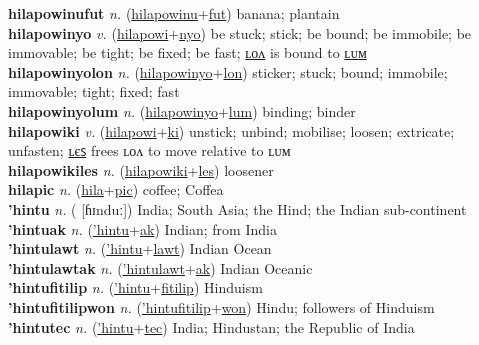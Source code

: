 \textbf{hilapowinufut} \textit{n.} (\hyperref[hilapowinu]{hilapowinu}+\hyperref[fut]{fut})
banana; plantain \label{hilapowinufut} \\
\textbf{hilapowinyo} \textit{v.} (\hyperref[hilapowi]{hilapowi}+\hyperref[nyo]{nyo})
be stuck; stick; be bound; be immobile; be immovable; be tight; be fixed; be fast; \hyperref[hilapowinyolon]{ʟᴏᴧ} is bound to \hyperref[hilapowinyolum]{ʟᴜᴍ} \label{hilapowinyo} \\
\textbf{hilapowinyolon} \textit{n.} (\hyperref[hilapowinyo]{hilapowinyo}+\hyperref[lon]{lon})
sticker; stuck; bound; immobile; immovable; tight; fixed; fast \label{hilapowinyolon} \\
\textbf{hilapowinyolum} \textit{n.} (\hyperref[hilapowinyo]{hilapowinyo}+\hyperref[lum]{lum})
binding; binder \label{hilapowinyolum} \\
\textbf{hilapowiki} \textit{v.} (\hyperref[hilapowi]{hilapowi}+\hyperref[ki]{ki})
unstick; unbind; mobilise; loosen; extricate; unfasten; \hyperref[hilapowikiles]{ʟєꜱ} frees ʟᴏᴧ to move relative to ʟᴜᴍ \label{hilapowiki} \\
\textbf{hilapowikiles} \textit{n.} (\hyperref[hilapowiki]{hilapowiki}+\hyperref[les]{les})
loosener \label{hilapowikiles} \\
\textbf{hilapic} \textit{n.} (\hyperref[hila]{hila}+\hyperref[pic]{pic})
coffee; Coffea \label{hilapic} \\
\textbf{'hintu} \textit{n.} ( [ɦɪnduː])
India; South Asia; the Hind; the Indian sub-continent \label{'hintu} \\
\textbf{'hintuak} \textit{n.} (\hyperref['hintu]{'hintu}+\hyperref[ak]{ak})
Indian; from India \label{'hintuak} \\
\textbf{'hintulawt} \textit{n.} (\hyperref['hintu]{'hintu}+\hyperref[lawt]{lawt})
Indian Ocean \label{'hintulawt} \\
\textbf{'hintulawtak} \textit{n.} (\hyperref['hintulawt]{'hintulawt}+\hyperref[ak]{ak})
Indian Oceanic \label{'hintulawtak} \\
\textbf{'hintufitilip} \textit{n.} (\hyperref['hintu]{'hintu}+\hyperref[fitilip]{fitilip})
Hinduism \label{'hintufitilip} \\
\textbf{'hintufitilipwon} \textit{n.} (\hyperref['hintufitilip]{'hintufitilip}+\hyperref[won]{won})
Hindu; followers of Hinduism \label{'hintufitilipwon} \\
\textbf{'hintutec} \textit{n.} (\hyperref['hintu]{'hintu}+\hyperref[tec]{tec})
India; Hindustan; the Republic of India \label{'hintutec} \\
